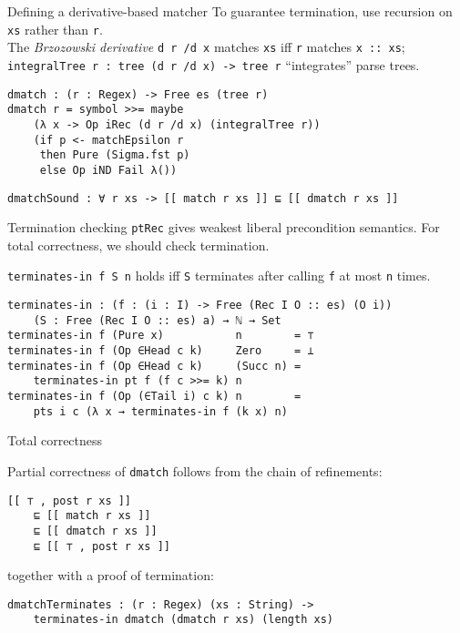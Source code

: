 \documentclass{beamer}
\newcommand{\Agda}[1]{\texttt{\footnotesize #1}\xspace}
\begin{document}
\begin{frame}[fragile]{Defining a derivative-based matcher}
To guarantee termination, use recursion on \Agda{xs} rather than \Agda{r}.\\
The \emph{Brzozowski derivative} \Agda{d r /d x} matches \Agda{xs} iff \Agda{r} matches \Agda{x :: xs};\\ \Agda{integralTree r : tree (d r /d x) -> tree r} ``integrates'' parse trees.

\begin{verbatim}
dmatch : (r : Regex) -> Free es (tree r)
dmatch r = symbol >>= maybe
    (λ x -> Op iRec (d r /d x) (integralTree r))
    (if p <- matchEpsilon r
     then Pure (Sigma.fst p)
     else Op iND Fail λ())
\end{verbatim}

\pause

\begin{verbatim}
dmatchSound : ∀ r xs -> [[ match r xs ]] ⊑ [[ dmatch r xs ]]
\end{verbatim}
\end{frame}

\begin{frame}[fragile]{Termination checking}
\Agda{ptRec} gives weakest liberal precondition semantics.
For total correctness, we should check termination.

\vspace{\baselineskip}
\Agda{terminates-in f S n} holds iff \Agda{S} terminates after calling \Agda{f} at most \Agda{n} times.
\vspace{-\baselineskip}

\begin{verbatim}
terminates-in : (f : (i : I) -> Free (Rec I O :: es) (O i))
    (S : Free (Rec I O :: es) a) → ℕ → Set
terminates-in f (Pure x)           n        = ⊤
terminates-in f (Op ∈Head c k)     Zero     = ⊥
terminates-in f (Op ∈Head c k)     (Succ n) =
    terminates-in pt f (f c >>= k) n
terminates-in f (Op (∈Tail i) c k) n        =
    pts i c (λ x → terminates-in f (k x) n)
\end{verbatim}
\end{frame}

\begin{frame}[fragile]{Total correctness}

Partial correctness of \Agda{dmatch} follows from the chain of refinements:
\begin{verbatim}
[[ ⊤ , post r xs ]]
    ⊑ [[ match r xs ]]
    ⊑ [[ dmatch r xs ]]
    ⊑ [[ ⊤ , post r xs ]]
\end{verbatim}
together with a proof of termination:
\begin{verbatim}
dmatchTerminates : (r : Regex) (xs : String) ->
    terminates-in dmatch (dmatch r xs) (length xs)
\end{verbatim}

\end{frame}
\end{document}
